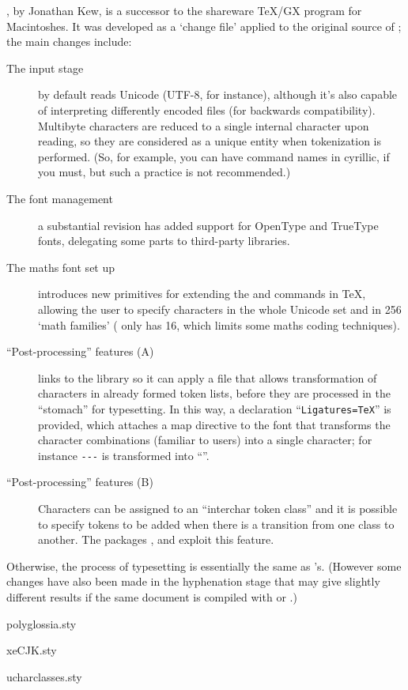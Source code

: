 \Question[Q-xetex]{\xetex{}}

\href{http://scripts.sil.org/xetex}{\xetex{}}, by Jonathan Kew, is a
successor to the shareware TeX/GX program for Macintoshes.  It was
developed as a  `change file' applied to the original source
of \tex{}; the main changes include:
\begin{description}
\item[The input stage] \xetex{} by default reads Unicode (UTF-8, for
  instance), although it's also capable of interpreting differently
  encoded files (for backwards compatibility).  Multibyte characters
  are reduced to a single internal character upon reading, so they are
  considered as a unique entity when tokenization is performed.  (So,
  for example, you can have command names in cyrillic, if you must,
  but such a practice is not recommended.)
\item[The font management] a substantial revision has added support
  for OpenType and TrueType fonts, delegating some parts to
  third-party libraries.
\item[The maths font set up] \xetex{} introduces new primitives for
  extending the  and  commands in TeX,
  allowing the user to specify characters in the whole Unicode set and
  in 256 `math families' (\tex{} only has 16, which limits some maths
  coding techniques).
\item[``Post-processing'' features (A)] \xetex{} links to the
   library so it can apply a  file
  that allows transformation of characters in already formed token
  lists, before they are processed in the ``stomach'' for typesetting.
  In this way, a declaration ``\texttt{Ligatures=TeX}'' is provided,
  which attaches a map directive to the font that transforms the
  character combinations (familiar to \tex{} users) into a single
  character; for instance \texttt{-{}-{}-} is transformed into
  ``\textemdash''.
\item[``Post-processing'' features (B)] Characters can be assigned to
  an ``interchar token class'' and it is possible to specify tokens to
  be added when there is a transition from one class to another.  The
  packages ,  and
   exploit this feature.
\end{description}
Otherwise, the process of typesetting is essentially the same as
\tex{}'s.  (However some changes have also been made in the
hyphenation stage that may give slightly different results if the same
document is compiled with \pdftex{} or \xetex{}.)
\begin{ctanrefs}
\item[polyglossia.sty]
\item[xeCJK.sty]
\item[ucharclasses.sty]
\end{ctanrefs}


